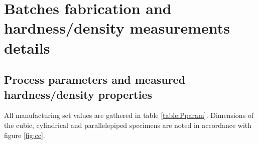 
\chapter{Batches fabrication and hardness/density measurements details} %

\label{AppendixA} %

\section{Process parameters and measured hardness/density properties}
\label{ppa}
All manufacturing set values are gathered in table \ref{table:Pparam}. Dimensions of the cubic, cylindrical and parallelepiped specimens are noted in accordance with figure \ref{fig:cc}.\\


